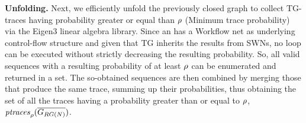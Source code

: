 \textbf{Unfolding.} Next, we efficiently unfold the previously closed graph to collect TG-traces having probability greater or equal than $\rho$ (\textsf{Minimum trace probability}) via the Eigen3 linear algebra library. %
Since an \uswn has a Workflow net as underlying control-flow structure and given that TG inherits the results from SWNs, no loop can be executed without strictly decreasing the resulting probability. So, all valid sequences with a resulting probability of at least $\rho$ can be enumerated and returned in a set. The so-obtained sequences are then combined by merging those that produce the same trace, summing up their probabilities, thus obtaining the set of all the traces having a probability greater than or equal to $\rho$, $\mathit{ptraces}_{\rho}(\overline{G_{RG(N)}})$. %
